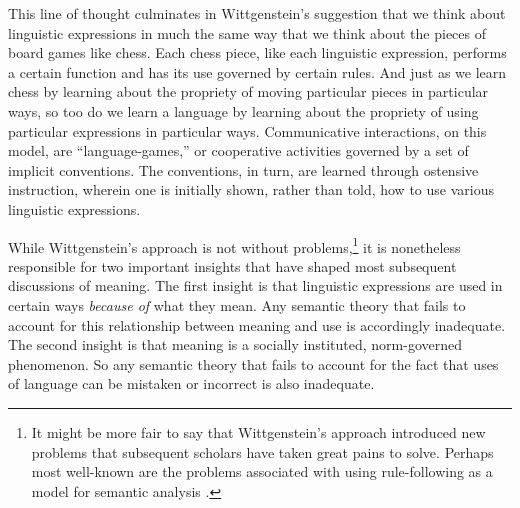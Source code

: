This line of thought culminates in Wittgenstein's suggestion that we think about linguistic expressions in much the same way that we think about the pieces of board games like chess. Each chess piece, like each linguistic expression, performs a certain function and has its use governed by certain rules. And just as we learn chess by learning about the propriety of moving particular pieces in particular ways, so too do we learn a language by learning about the propriety of using particular expressions in particular ways. Communicative interactions, on this model, are ``language-games,'' or cooperative activities governed by a set of implicit conventions. The conventions, in turn, are learned through ostensive instruction, wherein one is initially shown, rather than told, how to use various linguistic expressions. 

While Wittgenstein's approach is not without problems,\footnote{It might be more fair to say that Wittgenstein's approach introduced new problems that subsequent scholars have taken great pains to solve. Perhaps most well-known are the problems associated with using rule-following as a model for semantic analysis \citep[see][]{Brandom:1994,Kripke:1982}.} it is nonetheless responsible for two important insights that have shaped most subsequent discussions of meaning. The first insight is that linguistic expressions are used in certain ways \textit{because of} what they mean. Any semantic theory that fails to account for this relationship between meaning and use is accordingly inadequate. The second insight is that meaning is a socially instituted, norm-governed phenomenon. So any semantic theory that fails to account for the fact that uses of language can be mistaken or incorrect is also inadequate.

